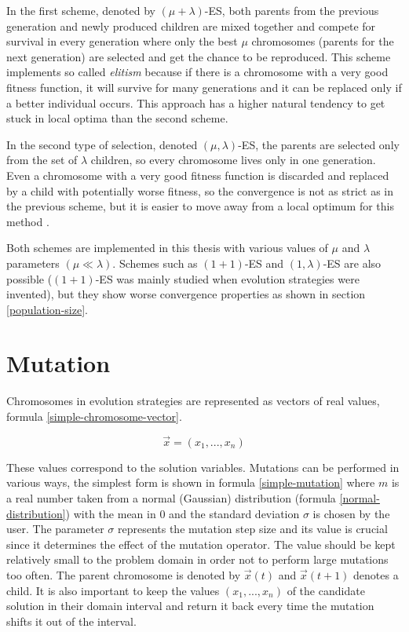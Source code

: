 In the first scheme, denoted by $(\mu + \lambda)$-ES, both parents from the previous generation and newly produced children are mixed together and compete for survival in every generation where only the best $\mu$ chromosomes (parents for the next generation) are selected and get the chance to be reproduced. This scheme implements so called \textit{elitism} because if there is a chromosome with a very good fitness function, it will survive for many generations and it can be replaced only if a better individual occurs. This approach has a higher natural tendency to get stuck in local optima than the second scheme.

In the second type of selection, denoted $(\mu,\lambda)$-ES, the parents are selected only from the set of $\lambda$ children, so every chromosome lives only in one generation. Even a chromosome with a very good fitness function is discarded and replaced by a child with potentially worse fitness, so the convergence is not as strict as in the previous scheme, but it is easier to move away from a local optimum for this method \cite{natural-computing-algorithms, introduction-to-evolutionary-computing}.

Both schemes are implemented in this thesis with various values of $\mu$ and $\lambda$ parameters $(\mu \ll \lambda)$. Schemes such as $(1 + 1)$-ES and $(1, \lambda)$-ES are also possible ($(1 + 1)$-ES was mainly studied when evolution strategies were invented), but they show worse convergence properties as shown in section \ref{population-size}.

\section{Mutation} \label{mutation-section}
Chromosomes in evolution strategies are represented as vectors of real values, formula \ref{simple-chromosome-vector}.

\begin{equation} \label{simple-chromosome-vector}
\vec{x} = (x_1,...,x_n)
 \end{equation}

These values correspond to the solution variables. Mutations can be performed in various ways, the simplest form is shown in formula \ref{simple-mutation} where $m$ is a real number taken from a normal (Gaussian) distribution (formula \ref{normal-distribution}) with the mean in $0$ and the standard deviation $\sigma$ is chosen by the user. The parameter $\sigma$ represents the mutation step size and its value is crucial since it determines the effect of the mutation operator. The value should be kept relatively small to the problem domain in order not to perform large mutations too often. The parent chromosome is denoted by $\vec{x}(t)$ and $\vec{x}(t+1)$ denotes a child. It is also important to keep the values $(x_1,...,x_n)$ of the candidate solution in their domain interval and return it back every time the mutation shifts it out of the interval.

